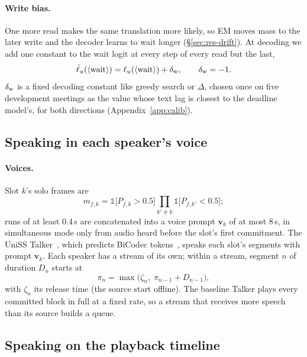 \paragraph{Write bias.} One more read makes the same translation more likely, so EM moves mass to the later write and
the decoder learns to wait longer (\S\ref{sec:res-drift}). At decoding we add one constant to the wait logit at every
step of every read but the last,
\begin{equation}
\tilde{\ell}_u(\langle\mathrm{wait}\rangle)=\ell_u(\langle\mathrm{wait}\rangle)+\delta_{\mathrm{w}},\qquad \delta_{\mathrm{w}}=-1 .
\label{eq:bias}
\end{equation}
$\delta_{\mathrm{w}}$ is a fixed decoding constant like greedy search or $\Delta$, chosen once on five development meetings as the
value whose text lag is closest to the deadline model's, for both directions (Appendix~\ref{app:calib}).

\subsection{Speaking in each speaker's voice}
\label{sec:method-voice}

\paragraph{Voices.} Slot $k$'s solo frames are
\begin{equation}
m_{f,k}=\mathds{1}\big[P_{f,k}>0.5\big]\prod_{k'\neq k}\mathds{1}\big[P_{f,k'}<0.5\big];
\label{eq:alone}
\end{equation}
runs of at least 0.4\,s are concatenated into a voice prompt $\bm{v}_k$ of at most 8\,s, in simultaneous mode only from
audio heard before the slot's first commitment. The UniSS Talker~\citep{uniss2025}, which predicts BiCodec
tokens~\citep{wang2025spark}, speaks each slot's segments with prompt $\bm{v}_k$. Each speaker has a stream of its own;
within a stream, segment $n$ of duration $D_n$ starts at
\begin{equation}
\pi_n=\max\big(\zeta_n,\;\pi_{n-1}+D_{n-1}\big),
\label{eq:layout}
\end{equation}
with $\zeta_n$ its release time (the source start offline). The baseline Talker plays every committed block in full at a
fixed rate, so a stream that receives more speech than its source builds a queue.

\subsection{Speaking on the playback timeline}
\label{sec:method-plem}

